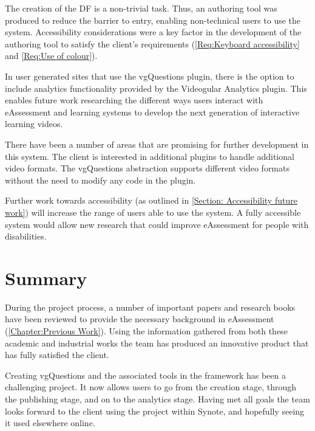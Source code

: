 The creation of the \gls{DF} is a non-trivial task. Thus, an authoring tool was produced to reduce the barrier to entry, enabling non-technical users to use the system. Accessibility considerations were a key factor in the development of the authoring tool to satisfy the client's requirements (\cref{Req:Keyboard accessibility} and \cref{Req:Use of colour}). 

In user generated sites that use the \gls{vgQuestions} plugin, there is the option to include analytics functionality provided by the \gls{Videogular} Analytics plugin. This enables future work researching the different ways users interact with eAssessment and learning systems to develop the next generation of interactive learning videos.

There have been a number of areas that are promising for further development in this system. The client is interested in additional plugins to handle additional video formats. The \gls{vgQuestions} abstraction supports different video formats without the need to modify any code in the plugin.

Further work towards accessibility (as outlined in \autoref{Section: Accessibility future work}) will increase the range of users able to use the system. A fully accessible system would allow new research that could improve eAssessment for people with disabilities.

\section{Summary}

During the project process, a number of important papers and research books have been reviewed to provide the necessary background in eAssessment (\autoref{Chapter:Previous Work}). Using the information gathered from both these academic and industrial works the team has produced an innovative  product that has fully satisfied the client.

Creating \gls{vgQuestions} and the associated tools in the framework has been a challenging project. It now allows users to go from the creation stage, through the publishing stage, and on to the analytics stage. Having met all goals the team looks forward to the client using the project within Synote, and hopefully seeing it used elsewhere online.

